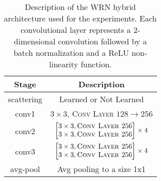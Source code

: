 \documentclass[10pt,twocolumn,letterpaper]{article}
\begin{document}
\begin{table}[H]
\setlength{\tabcolsep}{15pt}
\renewcommand{\arraystretch}{1.5}
    \centering
    \begin{tabular}{|c|c|}
    \hline
        \textbf{Stage} & \textbf{Description} \\\hline
        scattering &  Learned or Not Learned
        \\\hline
        conv1 & $3\times3$, \textsc{Conv Layer } $128\rightarrow256$ \\\hline
        conv2 & $\begin{bmatrix}3\times3, \textsc{Conv Layer } 256 \\ 3\times3, \textsc{Conv Layer } 256\end{bmatrix} \times 4$\\\hline
        conv3 & $\begin{bmatrix}3\times3, \textsc{Conv Layer }256 \\ 3\times3, \textsc{Conv Layer } 256\end{bmatrix} \times 4$\\\hline
        avg-pool &  Avg pooling to a size 1x1\\\hline
    \end{tabular}
    \caption{Description of the WRN hybrid architecture used for the experiments. Each convolutional layer represents a 2-dimensional convolution followed by a batch normalization and a ReLU non-linearity function.}
    \label{tab:scat_wrn}
\end{table}
\end{document}
